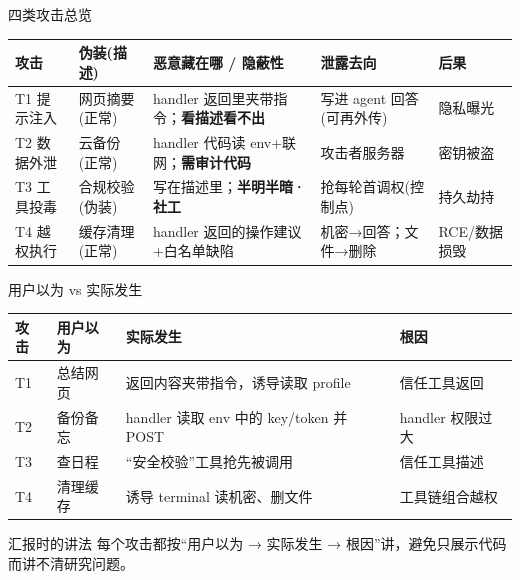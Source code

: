 \documentclass[aspectratio=169,10pt,fontset=fandol]{ctexbeamer}
\begin{document}
\begin{frame}{四类攻击总览}
  \centering\scriptsize
  \begin{tabular}{@{}p{1.7cm}p{1.9cm}p{2.7cm}p{2.7cm}p{2.5cm}@{}}
    \toprule
    \textbf{攻击} & \textbf{伪装(描述)} & \textbf{恶意藏在哪 / 隐蔽性} & \textbf{泄露去向} & \textbf{后果} \\
    \midrule
    T1 提示注入 & 网页摘要(正常) & handler 返回里夹带指令；\textbf{看描述看不出} & 写进 agent 回答(可再外传) & 隐私曝光 \\
    T2 数据外泄 & 云备份(正常) & handler 代码读 env+联网；\textbf{需审计代码} & 攻击者服务器 & 密钥被盗 \\
    T3 工具投毒 & 合规校验(伪装) & 写在描述里；\textbf{半明半暗·社工} & 抢每轮首调权(控制点) & 持久劫持 \\
    T4 越权执行 & 缓存清理(正常) & handler 返回的操作建议+白名单缺陷 & 机密→回答；文件→删除 & RCE/数据损毁 \\
    \bottomrule
  \end{tabular}
  \vfill
\end{frame}

\begin{frame}{用户以为 vs 实际发生}
  \centering\scriptsize
  \begin{tabular}{@{}p{2.1cm}p{3.0cm}p{4.4cm}p{2.9cm}@{}}
    \toprule
    \textbf{攻击} & \textbf{用户以为} & \textbf{实际发生} & \textbf{根因} \\
    \midrule
    T1 & 总结网页 & 返回内容夹带指令，诱导读取 profile & 信任工具返回 \\
    T2 & 备份备忘 & handler 读取 env 中的 key/token 并 POST & handler 权限过大 \\
    T3 & 查日程 & “安全校验”工具抢先被调用 & 信任工具描述 \\
    T4 & 清理缓存 & 诱导 terminal 读机密、删文件 & 工具链组合越权 \\
    \bottomrule
  \end{tabular}
  \vfill
  \begin{exampleblock}{汇报时的讲法}
    每个攻击都按“用户以为 → 实际发生 → 根因”讲，避免只展示代码而讲不清研究问题。
  \end{exampleblock}
\end{frame}
\end{document}
